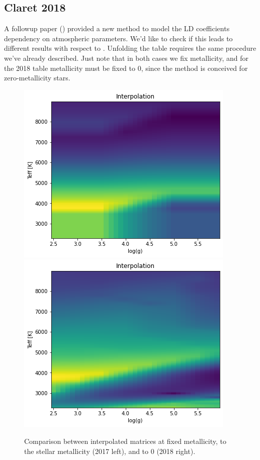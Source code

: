 \documentclass{aa}
\begin{document}
\subsection{Claret 2018}
A followup paper (\cite{claret2018}) provided a new method to model the LD coefficients dependency 
on atmospheric parameters. We'd like to check if this leads to different results 
with respect to \cite{claret2017}. Unfolding the table requires the same procedure 
we've already described. Just note that in both cases we fix metallicity, and for 
the 2018 table metallicity must be fixed to 0, since the method is conceived for
zero-metallicity stars.
\begin{figure}[H]
    \centering  
    \includegraphics[scale=0.4, angle=0]{pictures/2017.png}
    \includegraphics[scale=0.4, angle=0]{pictures/2018.png}
    \caption{Comparison between interpolated matrices at fixed metallicity, to the 
    stellar metallicity (2017 left), and to 0 (2018 right).}
\end{figure}
\end{document}
